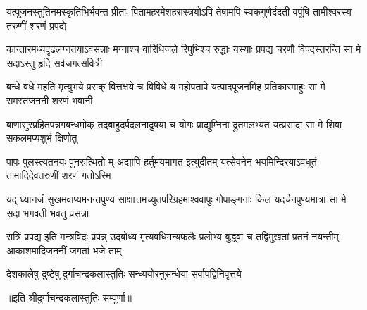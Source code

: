 \fourlineindentedshloka
{यत्पूजनस्तुतिनमस्कृतिभिर्भवन्त}
{प्रीताः पितामहरमेशहरास्त्रयोऽपि}
{तेषामपि स्वकगुणैर्ददती वपूंषि}
{तामीश्वरस्य तरुणीं शरणं प्रपद्ये} %


\fourlineindentedshloka
{कान्तारमध्यदृढलग्नतयाऽवसन्नाः}
{मग्नाश्च वारिधिजले रिपुभिश्च रुद्धाः}
{यस्याः प्रपद्य चरणौ विपदस्तरन्ति}
{सा मे सदाऽस्तु हृदि सर्वजगत्सवित्री} %


\fourlineindentedshloka
{बन्धे वधे महति मृत्युभये प्रसक्}
{वित्तक्षये च विविधे य महोपतापे}
{यत्पादपूजनमिह प्रतिकारमाहुः}
{सा मे समस्तजननी शरणं भवानी} %

\fourlineindentedshloka
{बाणासुरप्रहितपन्नगबन्धमोक्}
{तद्बाहुदर्पदलनादुषया च योगः}
{प्राद्युम्निना द्रुतमलभ्यत यत्प्रसादा}
{सा मे शिवा सकलमप्यशुभं क्षिणोतु} %

\fourlineindentedshloka
{पापः पुलस्त्यतनयः पुनरुत्थितो म्}
{अद्यापि हर्तुमयमागत इत्युदीतम्}
{यत्सेवनेन भयमिन्दिरयाऽवधूतं}
{तामादिदेवतरुणीं शरणं गतोऽस्मि} %

\fourlineindentedshloka
{यद् ध्यानजं सुखमवाप्यमनन्तपुण्य}
{साक्षात्तमच्युतपरिग्रहमाश्ववापुः}
{गोपाङ्गनाः किल यदर्चनपुण्यमात्रा}
{सा मे सदा भगवती भवतु प्रसन्ना} %

\fourlineindentedshloka
{रात्रिं प्रपद्य इति मन्त्रविदः प्रपन्न्}
{उद्बोध्य मृत्यवधिमन्यफलैः प्रलोभ्य}
{बुद्ध्वा च तद्विमुखतां प्रतनं नयन्तीम्}
{आकाशमादिजननीं जगतां भजे ताम्} %

\twolineshloka
{देशकालेषु दुष्टेषु दुर्गाचन्द्रकलास्तुतिः}
{सन्ध्ययोरनुसन्धेया सर्वापद्विनिवृत्तये}%

॥इति श्रीदुर्गाचन्द्रकलास्तुतिः सम्पूर्णा॥
